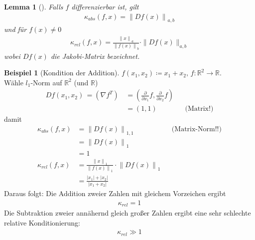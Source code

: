 \documentclass[ngerman,fontsize=11pt, paper=a4, parskip=half, titlepage=true, toc=bib]{scrbook}
\theoremstyle{definition}
\newtheorem{Bsp}[Def]{Beispiel}
\theoremstyle{plain}
\newtheorem{Lem}[Def]{Lemma}		%
\newcommand{\R}{\mathds{R}}
\newcommand{\nn}[1]{\left\| #1 \right\|}
\newcommand{\subsectione}[1]{\addtocounter{Def}{1}\subsection{#1}}
\newenvironment{Leme}[1][]{ %
  \begin{Lem}[#1]
  }
  {
  \end{Lem}
  \addtocounter{subsection}{1}
}
\newenvironment{Bspe}[1][]{ %
  \begin{Bsp}[#1]
  }
  {
  \end{Bsp}
  \addtocounter{subsection}{1}
}
\begin{document}
\begin{Leme}\label{3.2.8}
  Falls $f$ differenzierbar ist, gilt
  \begin{gather}
    \kappa_{abs}(f,x) = \nn{Df(x)}_{a,b} \label{III.2.4}
  \end{gather}
  und für $f(x) \neq 0$
  \begin{gather}
    \kappa_{rel}(f,x) = \frac{\nn{x}_a}{\nn{f(x)}_b}\cdot \|Df(x)\|_{a,b} \label{III.2.5}
  \end{gather}
  wobei $Df(x)$ die Jakobi-Matrix bezeichnet.
\end{Leme}

\begin{Bspe}[Kondition der Addition]
  \label{3.2.9} 
  $f(x_1, x_2) \coloneqq x_1 +x_2 , \, f:\R^2 \rightarrow \R$. \\
  Wähle $l_1$-Norm auf $\R^2$ (und $\R$)
  \begin{align*}
    Df(x_1, x_2) \, =(\nabla f^T) \, &= (\frac{\partial}{\partial x_1}f, \frac{\partial}{\partial x_2}f )\\
                                     &= (1,1) && \text{(Matrix!)}
  \end{align*}
  damit
  \begin{align*}
    \kappa_{abs} (f,x)&= \nn{Df(x)}_{1,1} && \text{(Matrix-Norm!!)}\\
                      &= \nn{Df(x)}_1 \\
                      &=1 \\
    \kappa_{rel} (f,x) &= \frac{\nn{x}_1}{\nn{f(x)}_1} \cdot \nn{Df(x)}_{1} \\
                      &= \frac{|x_1| + |x_2|}{|x_1+x_2|}
  \end{align*}
  Daraus folgt: Die Addition zweier Zahlen mit gleichem Vorzeichen ergibt
  \begin{gather*}
    \kappa_{rel} = 1
  \end{gather*}
  Die Subtraktion zweier annähernd gleich großer  Zahlen ergibt eine sehr schlechte relative
  Konditionierung:
  \begin{gather*}
    \kappa_{rel} \gg 1
  \end{gather*}
\end{Bspe}
\end{document}
